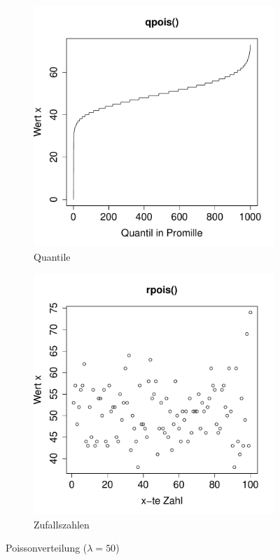 \begin{figure}[h!]
\begin{subfigure}[b]{0.48\textwidth}
\includegraphics{verteilungen-025}
\caption{Quantile}
\end{subfigure}
\begin{subfigure}[b]{0.48\textwidth}
\includegraphics{verteilungen-026}
\caption{Zufallszahlen}
\end{subfigure}
\caption{Poissonverteilung ($\lambda=50$)}
\end{figure}

